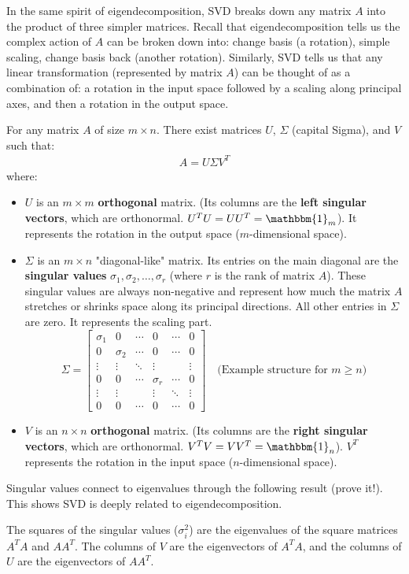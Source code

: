 \documentclass[11pt]{article}
\newcommand{\id}{\mathbbm{1}}
\begin{document}
In the same spirit of eigendecomposition, SVD breaks down any matrix $A$ into the product of three simpler matrices. Recall that eigendecomposition tells us the complex action of $A$ can be broken down into: change basis (a rotation), simple scaling, change basis back (another rotation). Similarly, SVD tells us that any linear transformation (represented by matrix $A$) can be thought of as a combination of:
a rotation in the input space followed by a scaling along principal axes, and then a rotation in the output space. 

\begin{theorem}
For any matrix $A$ of size $m \times n$. There exist matrices $U$, $\Sigma$ (capital Sigma), and $V$ such that:
\begin{align} \label{eq:svd}
    A = U \Sigma V^T
\end{align}
where:
\begin{itemize}
    \item $U$ is an $m \times m$ \textbf{orthogonal} matrix. (Its columns are the \textbf{left singular vectors}, which are orthonormal. $U^T U = U U^T = \id_m$). It represents the rotation in the output space ($m$-dimensional space).
    \item $\Sigma$ is an $m \times n$ "diagonal-like" matrix. Its entries on the main diagonal are the \textbf{singular values} $\sigma_1, \sigma_2, \ldots, \sigma_r$ (where $r$ is the rank of matrix $A$). These singular values are always non-negative and represent how much the matrix $A$ stretches or shrinks space along its principal directions. All other entries in $\Sigma$ are zero. It represents the scaling part.
    \[
    \Sigma = \begin{bmatrix}
        \sigma_1 & 0 & \cdots & 0 & \cdots & 0 \\
        0 & \sigma_2 & \cdots & 0 & \cdots & 0 \\
        \vdots & \vdots & \ddots & \vdots & & \vdots \\
        0 & 0 & \cdots & \sigma_r & \cdots & 0 \\
        \vdots & \vdots & & \vdots & \ddots & \vdots \\
        0 & 0 & \cdots & 0 & \cdots & 0
    \end{bmatrix}
    \quad \text{(Example structure for } m \ge n \text{)}
    \]
    \item $V$ is an $n \times n$ \textbf{orthogonal} matrix. (Its columns are the \textbf{right singular vectors}, which are orthonormal. $V^T V = V V^T = \id_n$). $V^T$ represents the rotation in the input space ($n$-dimensional space).
\end{itemize}
\end{theorem}
Singular values connect to eigenvalues through the following result (prove it!). This shows SVD is deeply related to eigendecomposition.
\begin{theorem}
    The squares of the singular values ($\sigma_i^2$) are the eigenvalues of the square matrices $A^T A$ and $AA^T$. The columns of $V$ are the eigenvectors of $A^T A$, and the columns of $U$ are the eigenvectors of $AA^T$.
\end{theorem}
\end{document}
